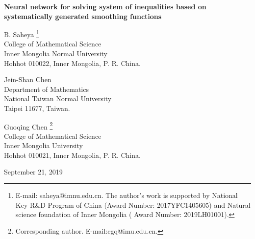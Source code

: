 \documentclass[12pt]{article}
\begin{document}
 \newtheorem{property}{Property}[section]
 \newtheorem{proposition}{Proposition}[section]
 \newtheorem{append}{Appendix}[section]
 \newtheorem{definition}{Definition}[section]
 \newtheorem{lemma}{Lemma}[section]
 \newtheorem{theorem}{Theorem}[section]
 \newtheorem{example}{Example}[section]
 \newtheorem{corollary}{Corollary}[section]
 \newtheorem{condition}{Condition}
 \newtheorem{remark}{Remark}[section]
 \newtheorem{assumption}{Assumption}[section]
 \newtheorem{algorithm}{Algorithm}[section]
 \newtheorem{problem}{Problem}[section]


 \medskip

 \begin{center}
 {\large \bf Neural network for solving system of inequalities
 based on systematically generated smoothing functions }

 \vskip1cm


 B. Saheya
 \footnote{E-mail: saheya@imnu.edu.cn. The author's work is supported by National
 Key R\&D Program of China (Award Number: 2017YFC1405605) and
Natural science foundation of Inner Mongolia ( Award Number: 2019LH01001).} \\
 College of Mathematical Science \\
 Inner Mongolia Normal University \\
 Hohhot 010022, Inner Mongolia, P. R. China.  \\


 \vskip1cm


%
%
%
%
 Jein-Shan Chen
 \\
 Department of Mathematics  \\
 National Taiwan Normal University \\
 Taipei 11677, Taiwan.

 \vskip1cm

 Guoqing Chen
 \footnote{Corresponding author. E-mail:cgq@imu.edu.cn. } \\
 College of Mathematical Science \\
 Inner Mongolia University \\
 Hohhot 010021, Inner Mongolia, P. R. China.  \\

 \medskip

 September 21, 2019

 \end{center}
\end{document}
